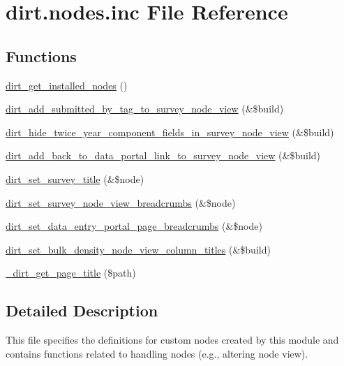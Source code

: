 \hypertarget{dirt_8nodes_8inc}{}\section{dirt.\+nodes.\+inc File Reference}
\label{dirt_8nodes_8inc}
\subsection*{Functions}
\begin{DoxyCompactItemize}
\item 
\mbox{\hyperlink{dirt_8nodes_8inc_aea18b078b62c937a9574d17c3a4a2805}{dirt\+\_\+get\+\_\+installed\+\_\+nodes}} ()
\item 
\mbox{\hyperlink{dirt_8nodes_8inc_ae9947827b646698ed3ee6d30b6534deb}{dirt\+\_\+add\+\_\+submitted\+\_\+by\+\_\+tag\+\_\+to\+\_\+survey\+\_\+node\+\_\+view}} (\&\$build)
\item 
\mbox{\hyperlink{dirt_8nodes_8inc_a41735ec0b898c6b9f1466c2b8257cd66}{dirt\+\_\+hide\+\_\+twice\+\_\+year\+\_\+component\+\_\+fields\+\_\+in\+\_\+survey\+\_\+node\+\_\+view}} (\&\$build)
\item 
\mbox{\hyperlink{dirt_8nodes_8inc_a93ce27c1f19a85b6a559d6c6d2814df1}{dirt\+\_\+add\+\_\+back\+\_\+to\+\_\+data\+\_\+portal\+\_\+link\+\_\+to\+\_\+survey\+\_\+node\+\_\+view}} (\&\$build)
\item 
\mbox{\hyperlink{dirt_8nodes_8inc_a2d57703b53cc2810f86c61fc63f803fa}{dirt\+\_\+set\+\_\+survey\+\_\+title}} (\&\$node)
\item 
\mbox{\hyperlink{dirt_8nodes_8inc_aa974b5cea01ee587230f557ead98ca04}{dirt\+\_\+set\+\_\+survey\+\_\+node\+\_\+view\+\_\+breadcrumbs}} (\&\$node)
\item 
\mbox{\hyperlink{dirt_8nodes_8inc_afe9e72362dff7c79e38ba49e5dba000e}{dirt\+\_\+set\+\_\+data\+\_\+entry\+\_\+portal\+\_\+page\+\_\+breadcrumbs}} (\&\$node)
\item 
\mbox{\hyperlink{dirt_8nodes_8inc_aca88938dc96db1edcffa882c5ee57645}{dirt\+\_\+set\+\_\+bulk\+\_\+density\+\_\+node\+\_\+view\+\_\+column\+\_\+titles}} (\&\$build)
\item 
\mbox{\hyperlink{dirt_8nodes_8inc_a6bebfa4e5a4b84fd7e2bcb436ecf276b}{\+\_\+dirt\+\_\+get\+\_\+page\+\_\+title}} (\$path)
\end{DoxyCompactItemize}


\subsection{Detailed Description}
This file specifies the definitions for custom nodes created by this module and contains functions related to handling nodes (e.\+g., altering node view). 

